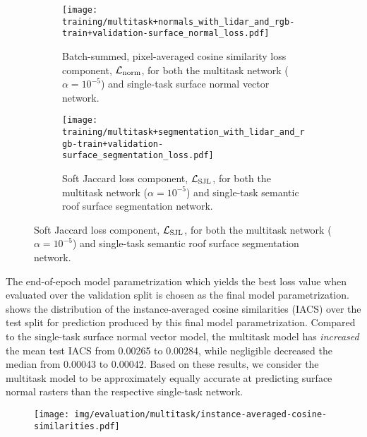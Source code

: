 \begin{figure}
  \centering
  \begin{subfigure}{\linewidth}
    \centering
    \texttt{[image: training/multitask+normals\_with\_lidar\_and\_rgb-train+validation-surface\_normal\_loss.pdf]}
    \caption{Batch-summed, pixel-averaged cosine similarity loss component, $\mathcal{L}_{\mathrm{norm}}$, for both the multitask network ($\alpha = 10^{-5}$) and single-task surface normal vector network.}
  \end{subfigure}
  \par\bigskip %
  \begin{subfigure}{\linewidth}
    \centering
    \texttt{[image: training/multitask+segmentation\_with\_lidar\_and\_rgb-train+validation-surface\_segmentation\_loss.pdf]}
    \caption{Soft Jaccard loss component, $\mathcal{L}_{\mathrm{SJL}}$, for both the multitask network ($\alpha = 10^{-5}$) and single-task semantic roof surface segmentation network.}
  \end{subfigure}
  \label{fig:full-multitask-training}
\end{figure}

The end-of-epoch model parametrization which yields the best loss value when evaluated over the validation split is chosen as the final model parametrization.
 shows the distribution of the instance-averaged cosine similarities (IACS) over the test split for prediction produced by this final model parametrization.
Compared to the single-task surface normal vector model, the multitask model has \emph{increased} the mean test IACS from \num{0.00265} to \num{0.00284}, while negligible decreased the median from \num{0.00043} to \num{0.00042}.
Based on these results, we consider the multitask model to be approximately equally accurate at predicting surface normal rasters than the respective single-task network.
%
\begin{figure}
  \texttt{[image: img/evaluation/multitask/instance-averaged-cosine-similarities.pdf]}
  \label{fig:multitask-test-distribution}
\end{figure}

